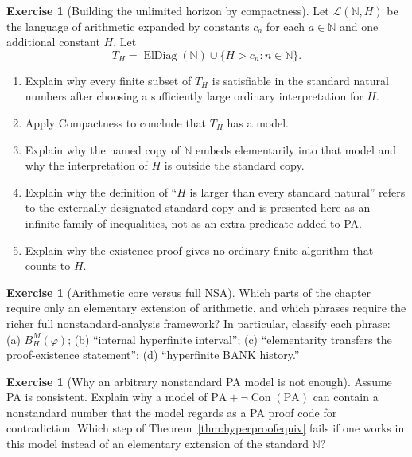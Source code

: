 \documentclass[11pt,openany]{book}
\theoremstyle{definition}
\newtheorem{exercise}[theorem]{Exercise}
\theoremstyle{remark}
\newcommand{\N}{\mathbb{N}}
\begin{document}
\begin{exercise}[Building the unlimited horizon by compactness]\label{ex:compactness-unlimited}
Let \(\mathcal L(\N,H)\) be the language of arithmetic expanded by constants \(c_a\) for each \(a\in\N\) and one additional constant \(H\). Let
\[
T_H=\operatorname{ElDiag}(\N)\cup\{H>c_n:n\in\N\}.
\]
\begin{enumerate}[label=(\alph*)]
\item Explain why every finite subset of \(T_H\) is satisfiable in the standard natural numbers after choosing a sufficiently large ordinary interpretation for \(H\).
\item Apply Compactness to conclude that \(T_H\) has a model.
\item Explain why the named copy of \(\N\) embeds elementarily into that model and why the interpretation of \(H\) is outside the standard copy.
\item Explain why the definition of ``\(H\) is larger than every standard natural'' refers to the externally designated standard copy and is presented here as an infinite family of inequalities, not as an extra predicate added to PA.
\item Explain why the existence proof gives no ordinary finite algorithm that counts to \(H\).
\end{enumerate}
\end{exercise}

\begin{exercise}[Arithmetic core versus full NSA]\label{ex:twoframeworks}
Which parts of the chapter require only an elementary extension of arithmetic, and which phrases require the richer full nonstandard-analysis framework? In particular, classify each phrase: (a) \(B_H^M(\varphi)\); (b) ``internal hyperfinite interval''; (c) ``elementarity transfers the proof-existence statement''; (d) ``hyperfinite BANK history.''
\end{exercise}

\begin{exercise}[Why an arbitrary nonstandard PA model is not enough]\label{ex:arbitrary-pa-model}
Assume PA is consistent. Explain why a model of \(\mathrm{PA}+\neg\operatorname{Con}(\mathrm{PA})\) can contain a nonstandard number that the model regards as a PA proof code for contradiction. Which step of Theorem~\ref{thm:hyperproofequiv} fails if one works in this model instead of an elementary extension of the standard \(\N\)?
\end{exercise}
\end{document}
